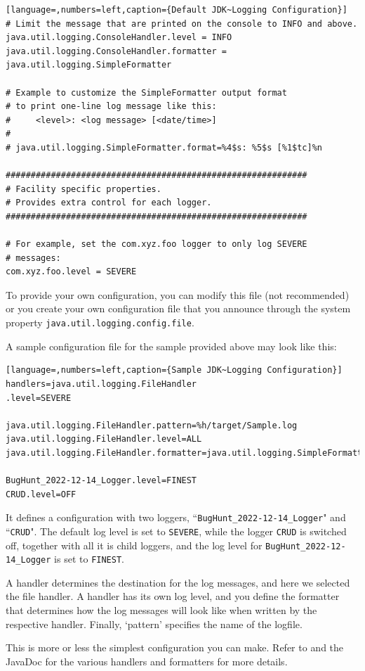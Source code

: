 \documentclass[11pt,a4paper, titlepage, parskip=half, headsepline, footsepline, cleardoublepage=current, headheight=1cm]{scrbook}
\begin{document}
\begin{lstlisting}[language=,numbers=left,caption={Default JDK~Logging Configuration}]
# Limit the message that are printed on the console to INFO and above.
java.util.logging.ConsoleHandler.level = INFO
java.util.logging.ConsoleHandler.formatter = java.util.logging.SimpleFormatter

# Example to customize the SimpleFormatter output format 
# to print one-line log message like this:
#     <level>: <log message> [<date/time>]
#
# java.util.logging.SimpleFormatter.format=%4$s: %5$s [%1$tc]%n

############################################################
# Facility specific properties.
# Provides extra control for each logger.
############################################################

# For example, set the com.xyz.foo logger to only log SEVERE
# messages:
com.xyz.foo.level = SEVERE
\end{lstlisting}

To provide your own configuration, you can modify this file (not recommended) or you create your own configuration file that you announce through the system property \verb#java.util.logging.config.file#.

A sample configuration file for the sample provided above may look like this:
\begin{lstlisting}[language=,numbers=left,caption={Sample JDK~Logging Configuration}]
handlers=java.util.logging.FileHandler
.level=SEVERE

java.util.logging.FileHandler.pattern=%h/target/Sample.log
java.util.logging.FileHandler.level=ALL
java.util.logging.FileHandler.formatter=java.util.logging.SimpleFormatter

BugHunt_2022-12-14_Logger.level=FINEST
CRUD.level=OFF
\end{lstlisting}

It defines a configuration with two loggers, “\verb#BugHunt_2022-12-14_Logger#" and “\verb#CRUD#". The default log level is set to \verb#SEVERE#, while the logger  \verb#CRUD# is switched off, together with all it is child loggers, and the log level for \verb#BugHunt_2022-12-14_Logger# is set to \verb#FINEST#.

A handler determines the destination for the log messages, and here we selected the file handler. A handler has its own log level, and you define the formatter that determines how the log messages will look like when written by the respective handler. Finally, ‘pattern’ specifies the name of the logfile.

This is more or less the simplest configuration you can make. Refer to \autocite{ORACLE_DOC_LOGGING_OVERVIEW, ORACLE_DOC_LOGGING_PACKAGE, ORACLE_DOC_LOGGING_PACKAGE} and the JavaDoc for the various handlers and formatters for more details.
\end{document}
